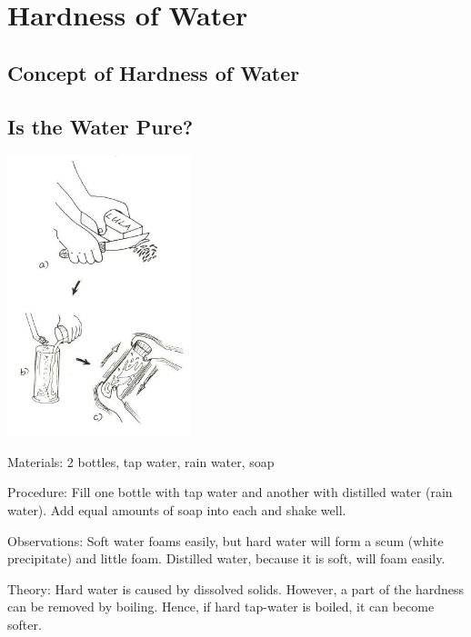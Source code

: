 \section{Hardness of Water}

\begin{multicols}{2}


\section*{Concept of Hardness of Water}


\subsection{Is the Water Pure?}
\label{sub:water-pure}

\begin{center}
\includegraphics[width=0.4\textwidth]{./img/source/hard-water.jpg}
\end{center}

\begin{description*}
\item[Materials:]{2 bottles, tap water, rain water, soap}
\item[Procedure:]{Fill one bottle with tap water and another with distilled water (rain water). Add equal amounts of soap into each and shake well. }
\item[Observations:]{Soft water foams easily, but hard
water will form a scum (white precipitate) and
little foam. Distilled water, because it is soft,
will foam easily.}
\item[Theory:]{Hard water is caused by dissolved solids.
However, a part of the hardness can be removed
by boiling. Hence, if hard tap-water is boiled, it
can become softer.}
\end{description*}


\end{multicols}
